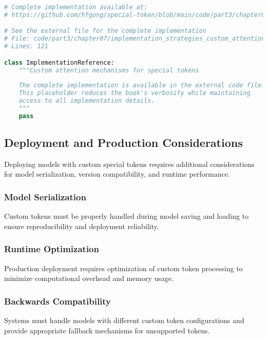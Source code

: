 \begin{lstlisting}[language=Python, caption={Custom attention mechanisms for special tokens}]
# Complete implementation available at:
# https://github.com/hfgong/special-token/blob/main/code/part3/chapter07/implementation_strategies_custom_attention_mechanisms_fo.py

# See the external file for the complete implementation
# File: code/part3/chapter07/implementation_strategies_custom_attention_mechanisms_fo.py
# Lines: 121

class ImplementationReference:
    """Custom attention mechanisms for special tokens
    
    The complete implementation is available in the external code file.
    This placeholder reduces the book's verbosity while maintaining
    access to all implementation details.
    """
    pass
\end{lstlisting}

\subsection{Deployment and Production Considerations}

Deploying models with custom special tokens requires additional considerations for model serialization, version compatibility, and runtime performance.

\subsubsection{Model Serialization}

Custom tokens must be properly handled during model saving and loading to ensure reproducibility and deployment reliability.

\subsubsection{Runtime Optimization}

Production deployment requires optimization of custom token processing to minimize computational overhead and memory usage.

\subsubsection{Backwards Compatibility}

Systems must handle models with different custom token configurations and provide appropriate fallback mechanisms for unsupported tokens.